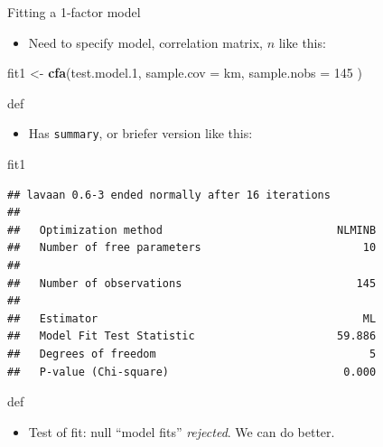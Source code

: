 \documentclass[ignorenonframetext,]{beamer}
\newenvironment{Shaded}{\begin{snugshade}}{\end{snugshade}}
\newcommand{\DataTypeTok}[1]{\textcolor[rgb]{0.13,0.29,0.53}{#1}}
\newcommand{\DecValTok}[1]{\textcolor[rgb]{0.00,0.00,0.81}{#1}}
\newcommand{\FloatTok}[1]{\textcolor[rgb]{0.00,0.00,0.81}{#1}}
\newcommand{\KeywordTok}[1]{\textcolor[rgb]{0.13,0.29,0.53}{\textbf{#1}}}
\newcommand{\NormalTok}[1]{#1}
\newcommand{\StringTok}[1]{\textcolor[rgb]{0.31,0.60,0.02}{#1}}
\providecommand{\tightlist}{%
  \setlength{\itemsep}{0pt}\setlength{\parskip}{0pt}}
\begin{document}
\begin{frame}[fragile]{Fitting a 1-factor model}
\protect\hypertarget{fitting-a-1-factor-model}{}

\begin{itemize}
\tightlist
\item
  Need to specify model, correlation matrix, \(n\) like this:
\end{itemize}

\begin{Shaded}
\begin{Highlighting}[]
\NormalTok{fit1 <-}\StringTok{ }\KeywordTok{cfa}\NormalTok{(test.model}\FloatTok{.1}\NormalTok{,}
  \DataTypeTok{sample.cov =}\NormalTok{ km,}
  \DataTypeTok{sample.nobs =} \DecValTok{145}
\NormalTok{)}
\end{Highlighting}
\end{Shaded}

def

\begin{itemize}
\tightlist
\item
  Has \texttt{summary}, or briefer version like this:
\end{itemize}

\begin{Shaded}
\begin{Highlighting}[]
\NormalTok{fit1}
\end{Highlighting}
\end{Shaded}

\begin{verbatim}
## lavaan 0.6-3 ended normally after 16 iterations
## 
##   Optimization method                           NLMINB
##   Number of free parameters                         10
## 
##   Number of observations                           145
## 
##   Estimator                                         ML
##   Model Fit Test Statistic                      59.886
##   Degrees of freedom                                 5
##   P-value (Chi-square)                           0.000
\end{verbatim}

def

\begin{itemize}
\tightlist
\item
  Test of fit: null ``model fits'' \emph{rejected}. We can do better.
\end{itemize}

\end{frame}
\end{document}
